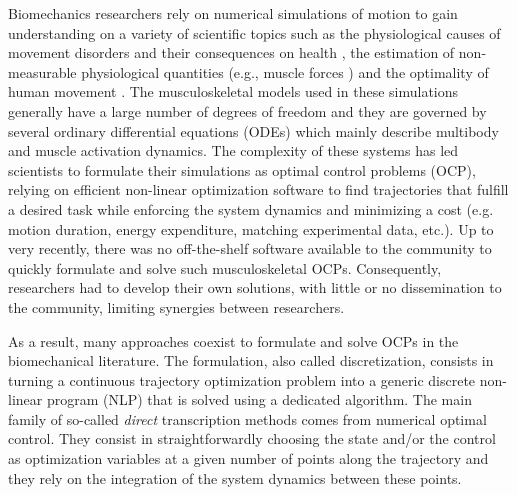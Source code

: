 Biomechanics researchers rely on numerical simulations of motion to gain understanding on a variety of scientific topics such as the physiological causes of movement disorders and their consequences on health \cite{pizzolato2015ceinms}, the estimation of non-measurable physiological quantities (e.g., muscle forces \cite{bailly2020real}) and the optimality of human movement \cite{porsa2016direct}.
The musculoskeletal models used in these simulations generally have a large number of degrees of freedom and they are governed by several ordinary differential equations (ODEs) which mainly describe multibody and muscle activation dynamics.
The complexity of these systems has led scientists to formulate their simulations as optimal control problems (OCP), relying on efficient non-linear optimization software to find trajectories that fulfill a desired task while enforcing the system dynamics and minimizing a cost (e.g. motion duration, energy expenditure, matching experimental data, etc.).
Up to very recently, there was no off-the-shelf software available to the community to quickly formulate and solve such musculoskeletal OCPs. 
Consequently, researchers had to develop their own solutions, with little or no dissemination to the community, limiting  synergies between researchers.


As a result, many approaches coexist to formulate and solve OCPs in the biomechanical literature. 
The formulation, also called discretization, consists in turning a continuous trajectory optimization problem into a generic discrete non-linear program (NLP) that is solved using a dedicated algorithm. 
The main family of so-called \textit{direct} transcription methods comes from numerical optimal control. 
They consist in straightforwardly choosing the state and/or the control as optimization variables at a given number of points along the trajectory and they rely on the integration of the system dynamics between these points. 

